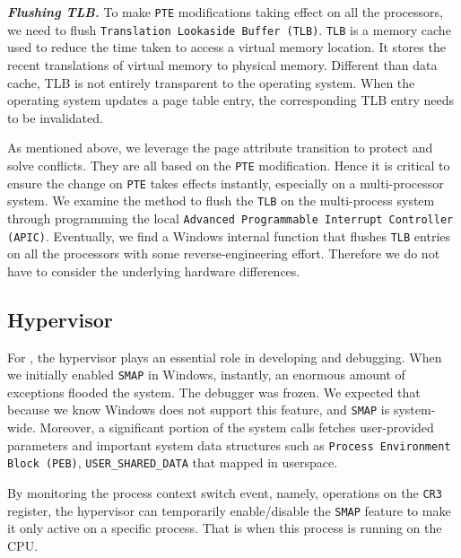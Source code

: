 
\textbf{\textit{Flushing TLB.}} To make \texttt{PTE} modifications taking effect on all the processors, we need to flush \texttt{Translation Lookaside Buffer (TLB)}. \texttt{TLB} is a memory cache used to reduce the time taken to access a virtual memory location. It stores the recent translations of virtual memory to physical memory. Different than data cache, TLB is not entirely transparent to the operating system. When the operating system updates a page table entry, the corresponding TLB entry needs to be invalidated.  

As mentioned above, we leverage the page attribute transition to protect and solve conflicts. They are all based on the \texttt{PTE} modification. Hence it is critical to ensure the change on \texttt{PTE} takes effects instantly, especially on a multi-processor system. We examine the method to flush the \texttt{TLB} on the multi-process system through programming the local \texttt{Advanced Programmable Interrupt Controller (APIC)}. Eventually, we find a Windows internal function that flushes \texttt{TLB} entries on all the processors with some reverse-engineering effort. Therefore we do not have to consider the underlying hardware differences.



\subsection{Hypervisor}


For \name, the hypervisor plays an essential role in developing and debugging. When we initially enabled \texttt{SMAP} in Windows, instantly, an enormous amount of exceptions flooded the system. The debugger was frozen.  We expected that because we know Windows does not support this feature, and \texttt{SMAP} is system-wide. Moreover, a significant portion of the system calls fetches user-provided parameters and important system data structures such as \texttt{Process Environment Block (PEB)}, \texttt{USER\_SHARED\_DATA} that mapped in userspace. 

By monitoring the process context switch event, namely, operations on the \texttt{CR3} register, the hypervisor can temporarily enable/disable the \texttt{SMAP} feature to make it only active on a specific process. That is when this process is running on the CPU.

